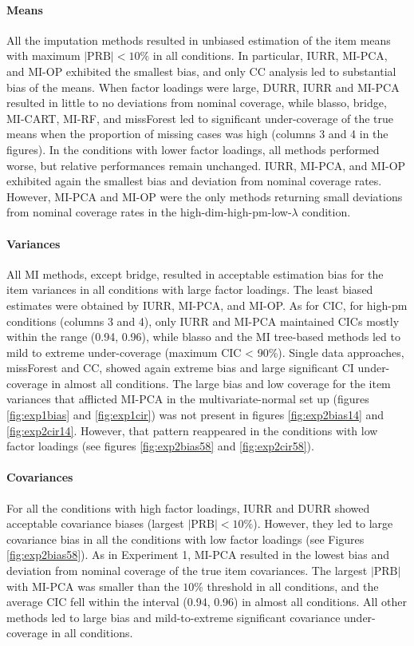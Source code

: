 	\paragraph{Means}
	All the imputation methods resulted in unbiased estimation of the item means with maximum $|\text{PRB}| < 10\%$ 
	in all conditions.
	In particular, IURR, MI-PCA, and MI-OP exhibited the smallest bias, and only CC analysis led to substantial 
	bias of the means.
	When factor loadings were large, DURR, IURR and MI-PCA resulted in little to no deviations from nominal 
	coverage, while blasso, bridge, MI-CART, MI-RF, and missForest led to significant under-coverage of the 
	true means when the proportion of missing cases was high (columns 3 and 4 in the figures).
	In the conditions with lower factor loadings, all methods performed worse, but relative performances remain
	unchanged.
	IURR, MI-PCA, and MI-OP exhibited again the smallest bias and deviation from nominal coverage rates.
	However, MI-PCA and MI-OP were the only methods returning small deviations from nominal coverage rates in the 
	high-dim-high-pm-low-$\lambda$ condition.
	
	\paragraph{Variances}
	All MI methods, except bridge, resulted in acceptable estimation bias for the item variances in all conditions
	with large factor loadings.
	The least biased estimates were obtained by IURR, MI-PCA, and MI-OP.
	As for CIC, for high-pm conditions (columns 3 and 4), only IURR and MI-PCA maintained CICs mostly within the 
	range (0.94, 0.96), while blasso and the MI tree-based methods led to mild to extreme under-coverage 
	(maximum CIC < 90\%).
	Single data approaches, missForest and CC, showed again extreme bias and large significant CI under-coverage 
	in almost all conditions.
	The large bias and low coverage for the item variances that afflicted MI-PCA in the multivariate-normal set up 
	(figures \ref{fig:exp1bias} and \ref{fig:exp1cir}) was not present in figures \ref{fig:exp2bias14} and 
	\ref{fig:exp2cir14}.
	However, that pattern reappeared in the conditions with low factor loadings (see figures \ref{fig:exp2bias58} 
	and \ref{fig:exp2cir58}).

	\paragraph{Covariances}
	For all the conditions with high factor loadings, IURR and DURR showed acceptable covariance biases 
	(largest $|\text{PRB}|<10\%$).
	However, they led to large covariance bias in all the conditions with low factor loadings 
	(see Figures \ref{fig:exp2bias58}).
	As in Experiment 1, MI-PCA resulted in the lowest bias and deviation from nominal coverage of the true 
	item covariances.
	The largest $|\text{PRB}|$ with MI-PCA was smaller than the $10\%$ threshold in all conditions, and the 
	average CIC fell within the interval (0.94, 0.96) in almost all conditions.
	All other methods led to large bias and mild-to-extreme significant covariance under-coverage 
	in all conditions.

